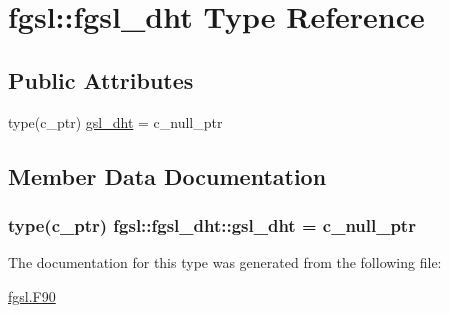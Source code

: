 \hypertarget{structfgsl_1_1fgsl__dht}{}\section{fgsl\+:\+:fgsl\+\_\+dht Type Reference}
\label{structfgsl_1_1fgsl__dht}
\subsection*{Public Attributes}
\begin{DoxyCompactItemize}
\item 
type(c\+\_\+ptr) \hyperlink{structfgsl_1_1fgsl__dht_a969a0f8a5c2cd5e83d3f55c4f06b51c0}{gsl\+\_\+dht} = c\+\_\+null\+\_\+ptr
\end{DoxyCompactItemize}


\subsection{Member Data Documentation}
\hypertarget{structfgsl_1_1fgsl__dht_a969a0f8a5c2cd5e83d3f55c4f06b51c0}{}
\subsubsection[{gsl\+\_\+dht}]{\setlength{\rightskip}{0pt plus 5cm}type(c\+\_\+ptr) fgsl\+::fgsl\+\_\+dht\+::gsl\+\_\+dht = c\+\_\+null\+\_\+ptr}\label{structfgsl_1_1fgsl__dht_a969a0f8a5c2cd5e83d3f55c4f06b51c0}


The documentation for this type was generated from the following file\+:\begin{DoxyCompactItemize}
\item 
\hyperlink{fgsl_8F90}{fgsl.\+F90}\end{DoxyCompactItemize}
